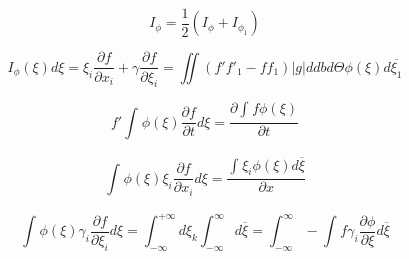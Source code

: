 \documentclass{article}
\begin{document}
\[ I_{\phi} = \frac{1}{2} (I_{\phi} + I_{{\phi}_1})\]

\[ I_{\phi}(\xi) d \xi =  \xi_i \frac{\partial f }{\partial x_i} + \gamma \frac{\partial f }{\partial \xi_i } = \iint (f' {f'}_1 - f f_1) |g| d db d \Theta \phi(\xi) d \overline{\xi_1} \]

\[ f'\int_{}^{} \phi(\xi) \frac{\partial f }{\partial t }d \xi = \frac{\partial \int_{}^{} f \phi (\xi) }{\partial t} \]

\[ \int_{}^{} \phi (\xi) \xi_i \frac{\partial f }{\partial x_i }d \xi = \frac{\int_{}^{} \xi_i \phi(\xi ) d \overline{\xi}}{\partial x} \]

\[ \int_{}^{} \phi (\xi) \gamma_i \frac{\partial f }{\partial \xi_i} d \xi = \int_{-\infty}^{+\infty} d \xi_k \int_{-\infty}^{\infty} d \overline{\xi} = \int_{-\infty}^{\infty}  -\int_{}^{} f \gamma_i \frac{\partial \phi}{\partial \xi } d \overline{\xi} \]
\end{document}

